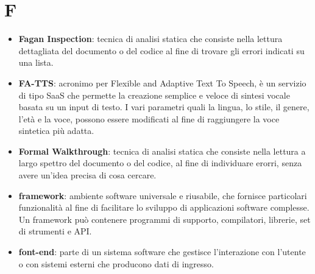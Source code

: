 \section{F}
\begin{itemize} 
	\item \textbf{Fagan Inspection}: tecnica di analisi statica che consiste nella lettura dettagliata del documento o del codice al fine di trovare gli errori indicati su una lista.
	\item \textbf{FA-TTS}: acronimo per Flexible and Adaptive Text To Speech, è un servizio di tipo SaaS che permette la creazione semplice e veloce di sintesi vocale basata su un input di testo. I vari parametri quali la lingua, lo stile, il genere, l'età e la voce, possono essere modificati al fine di raggiungere la voce sintetica più adatta.
	\item \textbf{Formal Walkthrough}: tecnica di analisi statica che consiste nella lettura a largo spettro del documento o del codice, al fine di individuare erorri, senza avere un'idea precisa di cosa cercare.
	\item \textbf{framework}: ambiente software universale e riusabile, che fornisce particolari funzionalità al fine di facilitare lo sviluppo di applicazioni software complesse. Un framework può contenere programmi di supporto, compilatori, librerie, set di strumenti e API.
 	\item \textbf{font-end}: parte di un sistema software che gestisce l'interazione con l'utente o con sistemi esterni che producono dati di ingresso.
\end{itemize}
